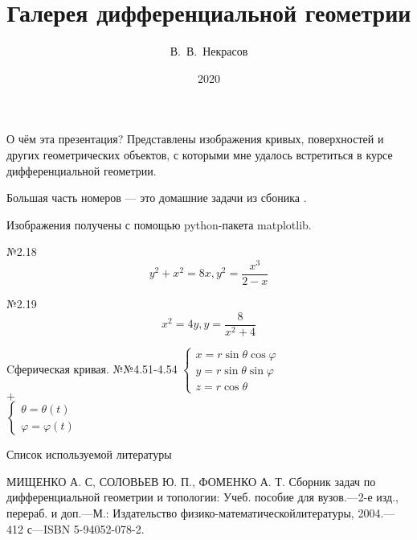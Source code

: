﻿\documentclass[10pt]{beamer}
\title{Галерея дифференциальной геометрии}
\institute{Механико-математический факультет МГУ}
\author{В.~В.~Некрасов}
\date{2020}
\begin{document}
\begin{frame}
\titlepage
\end{frame}

\begin{frame}{О чём эта презентация?}
Представлены изображения кривых, поверхностей и других геометрических объектов, с которыми мне удалось встретиться в курсе дифференциальной геометрии.

Большая часть номеров --- это домашние задачи из сбоника \cite{1}.

Изображения получены с помощью python-пакета matplotlib.
\end{frame}

\begin{frame}{№2.18 \cite{1}}
  \[y^2+x^2=8x, y^2=\frac{x^3}{2-x}\]
	\centering

\end{frame}

\begin{frame}{№2.19 \cite{1}}
  \[x^2=4y, y=\frac{8}{x^2+4}\]
	\centering

\end{frame}

\begin{frame}{Cферическая кривая. №№4.51-4.54 \cite{1}}
		\vspace*{2cm}
	$\begin{cases}
		x = r \sin\theta \cos\varphi\\
		y = r \sin\theta \sin\varphi  \\
		z = r \cos\theta
		\end{cases}$\\
	\vspace*{0.5cm}
	$+$\\
	\vspace*{0.5cm}	
	$\begin{cases}
	\theta=\theta(t)\\
	\varphi=\varphi(t)			
	\end{cases}$\\
	\begin{flushright}
		\vspace*{-5.5cm}
	\end{flushright}
\end{frame}

\begin{frame}{Список используемой литературы}
\begin{thebibliography}{3} 
 МИЩЕНКО А. С, СОЛОВЬЕВ Ю. П., ФОМЕНКО А. Т. Сборник задач по дифференциальной геометрии и топологии: Учеб. пособие для вузов.—2-е изд., перераб. и доп.—М.: Издательство физико-математическойлитературы, 2004.—412 с—ISBN 5-94052-078-2.
\end{thebibliography}

\end{frame}
\end{document}
